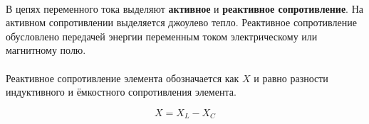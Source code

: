 \documentclass[dvipdfmx]{article}
\begin{document}
\paragraph{}
\noindent\makebox[\linewidth][c]{\rule{\linewidth}{0.4pt}}
\paragraph{}

\noindent{}

\paragraph{}
\noindent\makebox[\linewidth][c]{\rule{\linewidth}{0.4pt}}
\paragraph{}

В цепях переменного тока выделяют \textbf{активное} и \textbf{реактивное сопротивление}.
На активном сопротивлении выделяется джоулево тепло.
Реактивное сопротивление обусловлено передачей энергии переменным током электрическому или магнитному полю.

\paragraph{}

Реактивное сопротивление элемента обозначается как $X$ и равно разности индуктивного и ёмкостного сопротивления
элемента.

\begin{equation*}
  X = X_L - X_C
\end{equation*}
\end{document}
